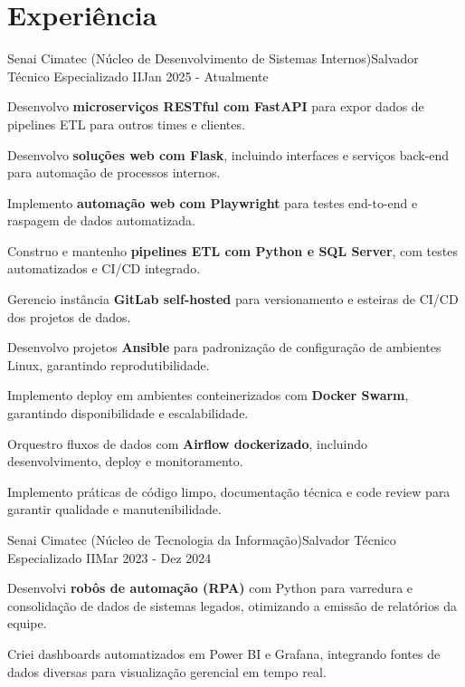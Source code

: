 \section{\textbf{Experiência}}
\resumeSubHeadingListStart
\resumeSubheading
{Senai Cimatec (Núcleo de Desenvolvimento de Sistemas Internos)}{Salvador}
{Técnico Especializado II}{Jan 2025 - Atualmente}
\vspace{-2.0mm}
\resumeItemListStart
\item {Desenvolvo \textbf{microserviços RESTful com FastAPI} para expor dados de pipelines ETL para outros times e clientes.}
\item {Desenvolvo \textbf{soluções web com Flask}, incluindo interfaces e serviços back-end para automação de processos internos.}
\item {Implemento \textbf{automação web com Playwright} para testes end-to-end e raspagem de dados automatizada.}
\item {Construo e mantenho \textbf{pipelines ETL com Python e SQL Server}, com testes automatizados e CI/CD integrado.}
\item {Gerencio instância \textbf{GitLab self-hosted} para versionamento e esteiras de CI/CD dos projetos de dados.}
\item {Desenvolvo projetos \textbf{Ansible} para padronização de configuração de ambientes Linux, garantindo reprodutibilidade.}
\item {Implemento deploy em ambientes conteinerizados com \textbf{Docker Swarm}, garantindo disponibilidade e escalabilidade.}
\item {Orquestro fluxos de dados com \textbf{Airflow dockerizado}, incluindo desenvolvimento, deploy e monitoramento.}
\item {Implemento práticas de código limpo, documentação técnica e code review para garantir qualidade e manutenibilidade.}
\resumeItemListEnd

\resumeSubheading
{Senai Cimatec (Núcleo de Tecnologia da Informação)}{Salvador}
{Técnico Especializado II}{Mar 2023 - Dez 2024}
\vspace{-2.0mm}
\resumeItemListStart
\item {Desenvolvi \textbf{robôs de automação (RPA)} com Python para varredura e consolidação de dados de sistemas legados, otimizando a emissão de relatórios da equipe.}
\item {Criei dashboards automatizados em Power BI e Grafana, integrando fontes de dados diversas para visualização gerencial em tempo real.}
\resumeItemListEnd

